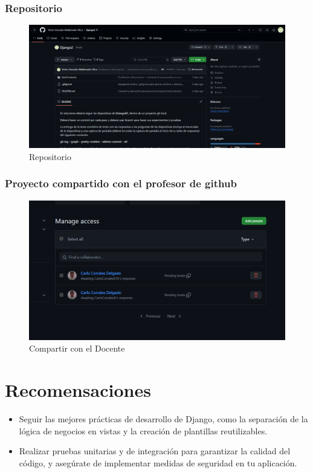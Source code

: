 \documentclass{article}
\begin{document}

	\subsubsection{Repositorio}
  \begin{figure}[H]
    \centering
    \includegraphics[width=1\textwidth, keepaspectratio]{img/repositorio.png}
    \caption{Repositorio}
  \end{figure}
  

	\subsubsection{Proyecto compartido con el profesor de github}
  \begin{figure}[H]
    \centering
    \includegraphics[width=1\textwidth, keepaspectratio]{img/compartir.png}
    \caption{Compartir con el Docente}
  \end{figure}
  

  \section{Recomensaciones}
  \begin{itemize}
    \item Seguir las mejores prácticas de desarrollo de Django, como la separación de la lógica de negocios en vistas y 
    la creación de plantillas reutilizables.
    \item Realizar pruebas unitarias y de integración para garantizar la calidad del código, y asegúrate de implementar 
    medidas de seguridad en tu aplicación.
  \end{itemize}
\end{document}
